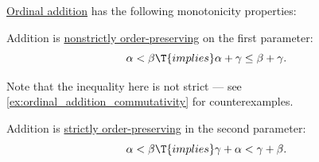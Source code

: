 \begin{proposition}\label{thm:ordinal_addition_is_monotone}
  \hyperref[def:ordinal_addition]{Ordinal addition} has the following monotonicity properties:
  \begin{thmenum}
     Addition is \hyperref[def:order_function/preserving]{nonstrictly order-preserving} on the first parameter:
    \begin{equation*}
      \alpha < \beta \T{implies} \alpha + \gamma \leq \beta + \gamma.
    \end{equation*}

    Note that the inequality here is not strict --- see \cref{ex:ordinal_addition_commutativity} for counterexamples.

     Addition is \hyperref[eq:def:order_function/preserving/strict]{strictly order-preserving} in the second parameter:
    \begin{equation*}
      \alpha < \beta \T{implies} \gamma + \alpha < \gamma + \beta.
    \end{equation*}
  \end{thmenum}
\end{proposition}
